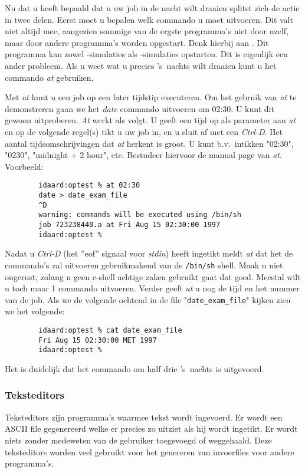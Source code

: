 Nu dat u heeft bepaald dat u uw job in de nacht wilt draaien splitst zich 
de actie in twee delen.
Eerst moet u bepalen welk commando u moet uitvoeren. Dit valt niet altijd
mee, aangezien sommige van de ergste programma's niet door uzelf, maar door
andere programma's worden opgestart. Denk hierbij aan . 
Dit programma kan zowel -simulaties als -simulaties
opstarten. Dit is eigenlijk een ander probleem.
Als u weet wat u precies 's~nachts wilt draaien kunt u het commando {\em at}
gebruiken.

Met {\em at} kunt u een job op een later tijdstip executeren.
Om het gebruik van {\em at} te demonstreren gaan we het {\em date} commando
uitvoeren om 02:30. U kunt dit gewoon uitproberen.
{\em At} werkt als volgt. U geeft een tijd op als parameter aan {\em at} en op
de volgende regel(s) tikt u uw job in, en u sluit af met een {\em Ctrl-D}.
Het aantal tijdsomschrijvingen dat {\em at} herkent is groot.
U kunt b.v.\ intikken "02:30", "0230", "midnight + 2 hour", etc.
Bestudeer hiervoor de manual page van {\em at}.
Voorbeeld:
\begin{verbatim}
        idaard:optest % at 02:30
        date > date_exam_file
        ^D
        warning: commands will be executed using /bin/sh
        job 723238440.a at Fri Aug 15 02:30:00 1997
        idaard:optest %
\end{verbatim}
Nadat u {\em Ctrl-D} (het ''eof'' signaal voor {\em stdin})
heeft ingetikt meldt {\em at} dat het de commando's zal uitvoeren
gebruikmakend van de {\tt /bin/sh} shell.
Maak u niet ongerust, zolang u geen
c-shell achtige zaken gebruikt gaat dat goed.
Meestal wilt u toch maar 1 commando uitvoeren.
Verder geeft {\em at} u nog de tijd en het nummer van de job.
Als we de volgende ochtend in de file "{\tt date\_exam\_file}"
kijken zien we het volgende:
\begin{verbatim}
        idaard:optest % cat date_exam_file
        Fri Aug 15 02:30:00 MET 1997
        idaard:optest %
\end{verbatim}
Het is duidelijk dat het commando om half drie 's~nachts is uitgevoerd.

\subsubsection{Teksteditors}
\label{Tekst editors}
Teksteditors 
zijn programma's waarmee tekst wordt ingevoerd.
Er wordt een ASCII file gegenereerd welke er precies zo uitziet
als hij wordt ingetikt. Er wordt niets zonder medeweten van de
gebruiker toegevoegd of weggehaald. Deze teksteditors worden 
veel gebruikt voor het genereren van invoerfiles voor andere
programma's. 

